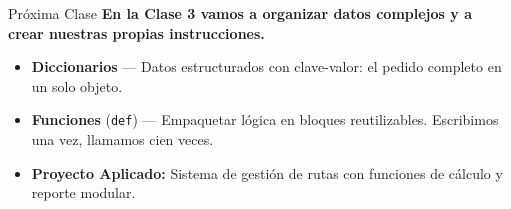 \documentclass[aspectratio=169, 11pt]{beamer}
\begin{document}
\begin{frame}{Próxima Clase}
  \vspace{-6pt}
  {\small\color{arcaDark}\bfseries
    En la Clase 3 vamos a organizar datos complejos y a crear nuestras propias instrucciones.}

  \vspace{8pt}
  {\footnotesize
  \begin{itemize}\setlength{\itemsep}{6pt}
    \item[{\color{arcaRed}\Large\faArrowCircleRight}]
      \textbf{Diccionarios} ---
      Datos estructurados con clave-valor: el pedido completo en un solo objeto.

    \item[{\color{arcaRed}\Large\faArrowCircleRight}]
      \textbf{Funciones} (\texttt{def}) ---
      Empaquetar lógica en bloques reutilizables.
      Escribimos una vez, llamamos cien veces.

    \item[{\color{arcaRed}\Large\faArrowCircleRight}]
      \textbf{Proyecto Aplicado:} Sistema de gestión de rutas
      con funciones de cálculo y reporte modular.
  \end{itemize}
  }
\end{frame}
\end{document}
